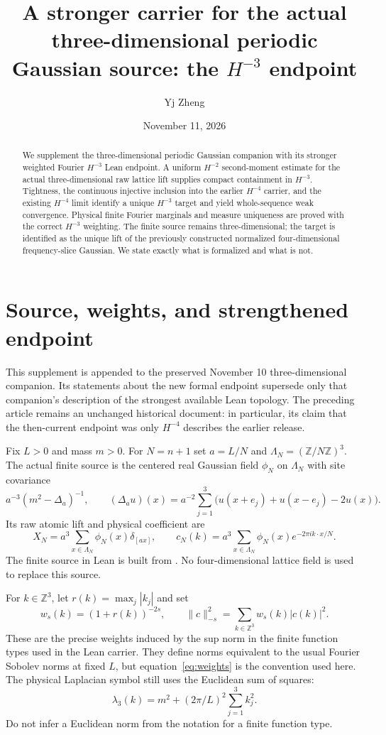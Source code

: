 \documentclass[11pt]{amsart}
\title[The three-dimensional H-minus-three endpoint]{A stronger carrier for the actual three-dimensional periodic Gaussian source: the $H^{-3}$ endpoint}
\author{Yj Zheng}
\date{November 11, 2026}
\theoremstyle{remark}\newtheorem{remark}[theorem]{Remark}
\newcommand{\Z}{\mathbb Z}\newcommand{\E}{\mathbb E}
\newcommand{\norm}[1]{\lVert#1\rVert}
\begin{document}
\begin{abstract}
We supplement the three-dimensional periodic Gaussian companion with its stronger weighted Fourier $H^{-3}$ Lean endpoint. A uniform $H^{-2}$ second-moment estimate for the actual three-dimensional raw lattice lift supplies compact containment in $H^{-3}$. Tightness, the continuous injective inclusion into the earlier $H^{-4}$ carrier, and the existing $H^{-4}$ limit identify a unique $H^{-3}$ target and yield whole-sequence weak convergence. Physical finite Fourier marginals and measure uniqueness are proved with the correct $H^{-3}$ weighting. The finite source remains three-dimensional; the target is identified as the unique lift of the previously constructed normalized four-dimensional frequency-slice Gaussian. We state exactly what is formalized and what is not.
\end{abstract}
\maketitle
\tableofcontents

\section{Source, weights, and strengthened endpoint}
This supplement is appended to the preserved November 10 three-dimensional companion. Its statements about the new formal endpoint supersede only that companion's description of the strongest available Lean topology. The preceding article remains an unchanged historical document: in particular, its claim that the then-current endpoint was only $H^{-4}$ describes the earlier release.

Fix $L>0$ and mass $m>0$. For $N=n+1$ set $a=L/N$ and $\Lambda_N=(\Z/N\Z)^3$. The actual finite source is the centered real Gaussian field $\phi_N$ on $\Lambda_N$ with site covariance
\[
 a^{-3}(m^2-\Delta_a)^{-1},\qquad
 (\Delta_a u)(x)=a^{-2}\sum_{j=1}^3
 \bigl(u(x+e_j)+u(x-e_j)-2u(x)\bigr).
\]
Its raw atomic lift and physical coefficient are
\begin{equation}\label{eq:raw}
 X_N=a^3\sum_{x\in\Lambda_N}\phi_N(x)\delta_{[ax]},
 \qquad c_N(k)=a^3\sum_{x\in\Lambda_N}\phi_N(x)e^{-2\pi i k\cdot x/N}.
\end{equation}
The finite source in Lean is built from . No four-dimensional lattice field is used to replace this source.

For $k\in\Z^3$, let $r(k)=\max_j|k_j|$ and set
\begin{equation}\label{eq:weights}
 w_s(k)=(1+r(k))^{-2s},\qquad
 \norm{c}_{-s}^2=\sum_{k\in\Z^3}w_s(k)|c(k)|^2.
\end{equation}
These are the precise weights induced by the sup norm in the finite function types used in the Lean carrier. They define norms equivalent to the usual Fourier Sobolev norms at fixed $L$, but equation~\eqref{eq:weights} is the convention used here. The physical Laplacian symbol still uses the Euclidean sum of squares:
\[
 \lambda_3(k)=m^2+(2\pi/L)^2\sum_{j=1}^3k_j^2.
\]
Do not infer a Euclidean norm from the notation for a finite function type.
\end{document}
